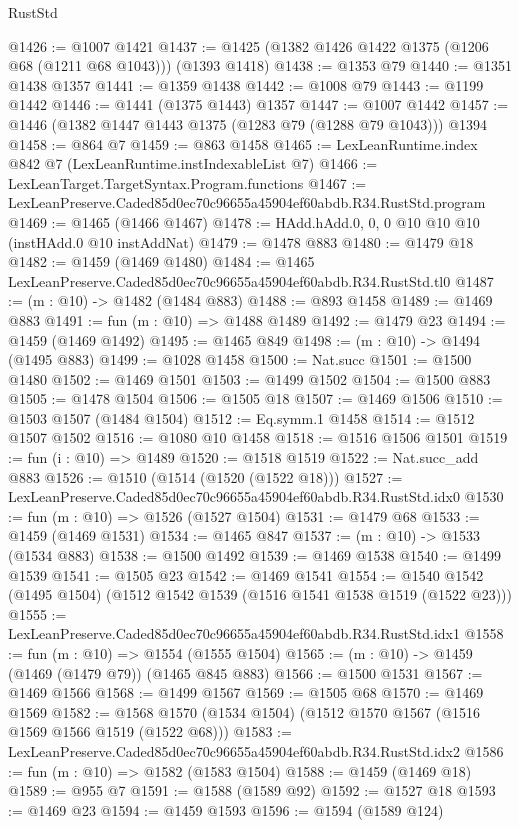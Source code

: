 \begin{lexlean}{RustStd}
\begin{coremodule}
@1426 := @1007 @1421
@1437 := @1425 (@1382 @1426 @1422 @1375 (@1206 @68 (@1211 @68 @1043))) (@1393 @1418)
@1438 := @1353 @79
@1440 := @1351 @1438 @1357
@1441 := @1359 @1438
@1442 := @1008 @79
@1443 := @1199 @1442
@1446 := @1441 (@1375 @1443) @1357
@1447 := @1007 @1442
@1457 := @1446 (@1382 @1447 @1443 @1375 (@1283 @79 (@1288 @79 @1043))) @1394
@1458 := @864 @7
@1459 := @863 @1458
@1465 := LexLeanRuntime.index @842 @7 (LexLeanRuntime.instIndexableList @7)
@1466 := LexLeanTarget.TargetSyntax.Program.functions
@1467 := LexLeanPreserve.Caded85d0ec70c96655a45904ef60abdb.R34.RustStd.program
@1469 := @1465 (@1466 @1467)
@1478 := HAdd.hAdd.{0, 0, 0} @10 @10 @10 (instHAdd.{0} @10 instAddNat)
@1479 := @1478 @883
@1480 := @1479 @18
@1482 := @1459 (@1469 @1480)
@1484 := @1465 LexLeanPreserve.Caded85d0ec70c96655a45904ef60abdb.R34.RustStd.tl0
@1487 := (m : @10) -> @1482 (@1484 @883)
@1488 := @893 @1458
@1489 := @1469 @883
@1491 := fun (m : @10) => @1488 @1489
@1492 := @1479 @23
@1494 := @1459 (@1469 @1492)
@1495 := @1465 @849
@1498 := (m : @10) -> @1494 (@1495 @883)
@1499 := @1028 @1458
@1500 := Nat.succ
@1501 := @1500 @1480
@1502 := @1469 @1501
@1503 := @1499 @1502
@1504 := @1500 @883
@1505 := @1478 @1504
@1506 := @1505 @18
@1507 := @1469 @1506
@1510 := @1503 @1507 (@1484 @1504)
@1512 := Eq.symm.{1} @1458
@1514 := @1512 @1507 @1502
@1516 := @1080 @10 @1458
@1518 := @1516 @1506 @1501
@1519 := fun (i : @10) => @1489
@1520 := @1518 @1519
@1522 := Nat.succ_add @883
@1526 := @1510 (@1514 (@1520 (@1522 @18)))
@1527 := LexLeanPreserve.Caded85d0ec70c96655a45904ef60abdb.R34.RustStd.idx0
@1530 := fun (m : @10) => @1526 (@1527 @1504)
@1531 := @1479 @68
@1533 := @1459 (@1469 @1531)
@1534 := @1465 @847
@1537 := (m : @10) -> @1533 (@1534 @883)
@1538 := @1500 @1492
@1539 := @1469 @1538
@1540 := @1499 @1539
@1541 := @1505 @23
@1542 := @1469 @1541
@1554 := @1540 @1542 (@1495 @1504) (@1512 @1542 @1539 (@1516 @1541 @1538 @1519 (@1522 @23)))
@1555 := LexLeanPreserve.Caded85d0ec70c96655a45904ef60abdb.R34.RustStd.idx1
@1558 := fun (m : @10) => @1554 (@1555 @1504)
@1565 := (m : @10) -> @1459 (@1469 (@1479 @79)) (@1465 @845 @883)
@1566 := @1500 @1531
@1567 := @1469 @1566
@1568 := @1499 @1567
@1569 := @1505 @68
@1570 := @1469 @1569
@1582 := @1568 @1570 (@1534 @1504) (@1512 @1570 @1567 (@1516 @1569 @1566 @1519 (@1522 @68)))
@1583 := LexLeanPreserve.Caded85d0ec70c96655a45904ef60abdb.R34.RustStd.idx2
@1586 := fun (m : @10) => @1582 (@1583 @1504)
@1588 := @1459 (@1469 @18)
@1589 := @955 @7
@1591 := @1588 (@1589 @92)
@1592 := @1527 @18
@1593 := @1469 @23
@1594 := @1459 @1593
@1596 := @1594 (@1589 @124)

\end{coremodule}
\end{lexlean}
